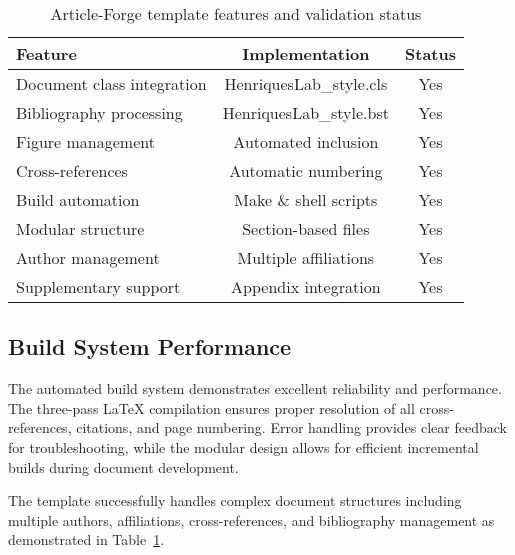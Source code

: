 \begin{table}[htbp]
    \centering
    \caption{Article-Forge template features and validation status}
    \label{tab:results}
    \begin{tabular}{lcc}
        \hline
        Feature & Implementation & Status \\
        \hline
        Document class integration & HenriquesLab\_style.cls & Yes \\
        Bibliography processing & HenriquesLab\_style.bst & Yes \\
        Figure management & Automated inclusion & Yes \\
        Cross-references & Automatic numbering & Yes \\
        Build automation & Make \& shell scripts & Yes \\
        Modular structure & Section-based files & Yes \\
        Author management & Multiple affiliations & Yes \\
        Supplementary support & Appendix integration & Yes \\
        \hline
    \end{tabular}
\end{table}

\subsection{Build System Performance}

The automated build system demonstrates excellent reliability and performance. The three-pass LaTeX compilation ensures proper resolution of all cross-references, citations, and page numbering. Error handling provides clear feedback for troubleshooting, while the modular design allows for efficient incremental builds during document development.

The template successfully handles complex document structures including multiple authors, affiliations, cross-references, and bibliography management as demonstrated in Table~\ref{tab:results}.
